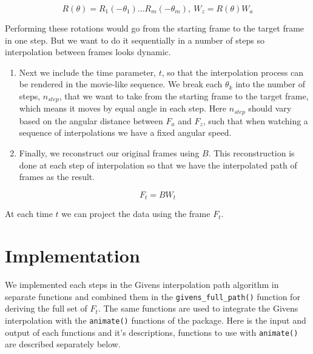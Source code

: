 \[R(\theta) = R_1(-\theta_1) ... R_m(-\theta_m), \    W_z = R(\theta)W_a\]

Performing these rotations would go from the starting frame to the
target frame in one step. But we want to do it sequentially in a number
of steps so interpolation between frames looks dynamic.

\begin{enumerate}
\def\labelenumi{\arabic{enumi}.}
\setcounter{enumi}{4}
\item
  Next we include the time parameter, \(t\), so that the interpolation
  process can be rendered in the movie-like sequence. We break each
  \(\theta_k\) into the number of steps, \(n_{step}\), that we want to
  take from the starting frame to the target frame, which means it moves
  by equal angle in each step. Here \(n_{step}\) should vary based on
  the angular distance between \(F_a\) and \(F_z\), such that when
  watching a sequence of interpolations we have a fixed angular speed.
\item
  Finally, we reconstruct our original frames using \(B\). This
  reconstruction is done at each step of interpolation so that we have
  the interpolated path of frames as the result.
\end{enumerate}

\[F_t = B  W_t\]

At each time \(t\) we can project the data using the frame \(F_t\).

\hypertarget{implementation}{%
\section{Implementation}\label{implementation}}

We implemented each steps in the Givens interpolation path algorithm in
separate functions and combined them in the
\texttt{givens\_full\_path()} function for deriving the full set of
\(F_t\). The same functions are used to integrate the Givens
interpolation with the \texttt{animate()} functions of the
 package. Here is the input and output of each functions
and it's descriptions, functions to use with \texttt{animate()} are
described separately below.

